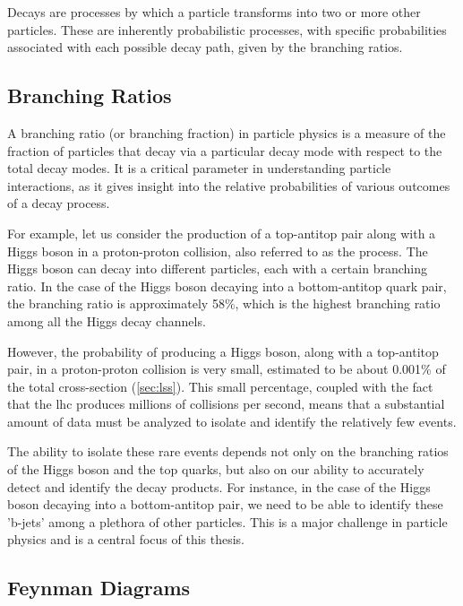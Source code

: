 Decays are processes by which a particle transforms into two or more other particles. These are inherently probabilistic
processes, with specific probabilities associated with each possible decay path, given by the branching ratios.


\subsection{Branching Ratios}

A branching ratio (or branching fraction) in particle physics is a measure of the fraction of particles that decay via a
particular decay mode with respect to the total decay modes. It is a critical parameter in understanding particle
interactions, as it gives insight into the relative probabilities of various outcomes of a decay process.

For example, let us consider the production of a top-antitop pair along with a Higgs boson in a proton-proton collision,
also referred to as the \tth process. The Higgs boson can decay into different particles, each with a certain branching
ratio. In the case of the Higgs boson decaying into a bottom-antitop quark pair, the branching ratio is approximately
58\%, which is the highest branching ratio among all the Higgs decay channels.

However, the probability of producing a Higgs boson, along with a top-antitop pair, in a proton-proton collision is very
small, estimated to be about 0.001\% of the total cross-section (\autoref{sec:lss}). This small percentage, coupled with
the fact that the \gls{lhc} produces millions of collisions per second, means that a substantial amount of data must be
analyzed to isolate and identify the relatively few \tth events.

The ability to isolate these rare events depends not only on the branching ratios of the Higgs boson and the top quarks,
but also on our ability to accurately detect and identify the decay products. For instance, in the case of the Higgs
boson decaying into a bottom-antitop pair, we need to be able to identify these 'b-jets' among a plethora of other
particles. This is a major challenge in particle physics and is a central focus of this thesis.

\subsection{Feynman Diagrams}



